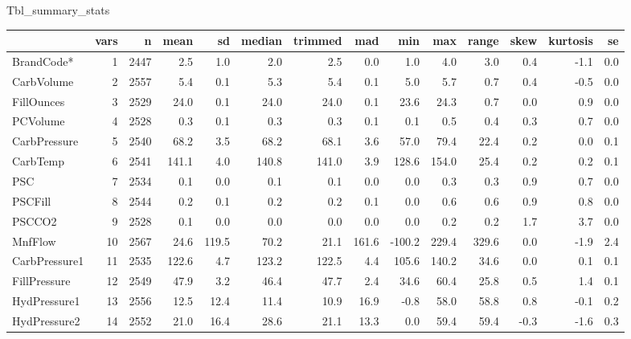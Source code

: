 \documentclass[]{report}
\newenvironment{Shaded}{\begin{snugshade}}{\end{snugshade}}
\newcommand{\NormalTok}[1]{#1}
\begin{document}
\begin{Shaded}
\begin{Highlighting}[]
\NormalTok{Tbl_summary_stats}
\end{Highlighting}
\end{Shaded}

\begin{table}[H]
\centering\begingroup\fontsize{8}{10}\selectfont

\begin{tabular}{lrrrrrrrrrrrrr}
\toprule
  & vars & n & mean & sd & median & trimmed & mad & min & max & range & skew & kurtosis & se\\
\midrule
\rowcolor{gray!6}  BrandCode* & 1 & 2447 & 2.5 & 1.0 & 2.0 & 2.5 & 0.0 & 1.0 & 4.0 & 3.0 & 0.4 & -1.1 & 0.0\\
CarbVolume & 2 & 2557 & 5.4 & 0.1 & 5.3 & 5.4 & 0.1 & 5.0 & 5.7 & 0.7 & 0.4 & -0.5 & 0.0\\
\rowcolor{gray!6}  FillOunces & 3 & 2529 & 24.0 & 0.1 & 24.0 & 24.0 & 0.1 & 23.6 & 24.3 & 0.7 & 0.0 & 0.9 & 0.0\\
PCVolume & 4 & 2528 & 0.3 & 0.1 & 0.3 & 0.3 & 0.1 & 0.1 & 0.5 & 0.4 & 0.3 & 0.7 & 0.0\\
\rowcolor{gray!6}  CarbPressure & 5 & 2540 & 68.2 & 3.5 & 68.2 & 68.1 & 3.6 & 57.0 & 79.4 & 22.4 & 0.2 & 0.0 & 0.1\\
\addlinespace
CarbTemp & 6 & 2541 & 141.1 & 4.0 & 140.8 & 141.0 & 3.9 & 128.6 & 154.0 & 25.4 & 0.2 & 0.2 & 0.1\\
\rowcolor{gray!6}  PSC & 7 & 2534 & 0.1 & 0.0 & 0.1 & 0.1 & 0.0 & 0.0 & 0.3 & 0.3 & 0.9 & 0.7 & 0.0\\
PSCFill & 8 & 2544 & 0.2 & 0.1 & 0.2 & 0.2 & 0.1 & 0.0 & 0.6 & 0.6 & 0.9 & 0.8 & 0.0\\
\rowcolor{gray!6}  PSCCO2 & 9 & 2528 & 0.1 & 0.0 & 0.0 & 0.0 & 0.0 & 0.0 & 0.2 & 0.2 & 1.7 & 3.7 & 0.0\\
MnfFlow & 10 & 2567 & 24.6 & 119.5 & 70.2 & 21.1 & 161.6 & -100.2 & 229.4 & 329.6 & 0.0 & -1.9 & 2.4\\
\addlinespace
\rowcolor{gray!6}  CarbPressure1 & 11 & 2535 & 122.6 & 4.7 & 123.2 & 122.5 & 4.4 & 105.6 & 140.2 & 34.6 & 0.0 & 0.1 & 0.1\\
FillPressure & 12 & 2549 & 47.9 & 3.2 & 46.4 & 47.7 & 2.4 & 34.6 & 60.4 & 25.8 & 0.5 & 1.4 & 0.1\\
\rowcolor{gray!6}  HydPressure1 & 13 & 2556 & 12.5 & 12.4 & 11.4 & 10.9 & 16.9 & -0.8 & 58.0 & 58.8 & 0.8 & -0.1 & 0.2\\
HydPressure2 & 14 & 2552 & 21.0 & 16.4 & 28.6 & 21.1 & 13.3 & 0.0 & 59.4 & 59.4 & -0.3 & -1.6 & 0.3\\

\end{tabular}
\end{table}
\end{document}
